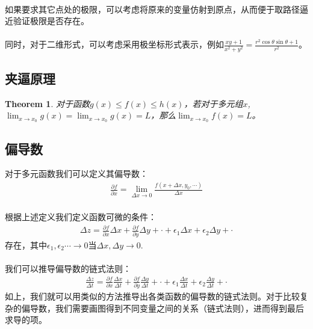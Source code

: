 \documentclass[12pt,a4paper,UTF8]{ctexbook}
\theoremstyle{plain}
\newtheorem{theorem}{\indent Theorem}[section]
\begin{document}
\paragraph{}如果要求其它点处的极限，可以考虑将原来的变量仿射到原点，从而便于取路径逼近验证极限是否存在。
\paragraph{}同时，对于二维形式，可以考虑采用极坐标形式表示，例如$\frac{xy+1}{x^2+y^2}=\frac{r^2\cos \theta \sin \theta +1}{r^2}$。
\subsection{夹逼原理}
\begin{theorem}
对于函数$g(x)\leq f(x)\leq h(x)$，若对于多元组$x$,$\lim_{x\to x_0} g(x)=\lim_{x\to x_0} g(x)=L$，那么$\lim_{x\to x_0} f(x)=L$。
\end{theorem}
\subsection{偏导数}
对于多元函数我们可以定义其偏导数：
\begin{align*}
    \frac{\partial f}{\partial x}=\lim_{\Delta x\to 0}\frac{f(x+\Delta x,y_0,\cdots)}{\Delta x}
\end{align*}
\paragraph{}根据上述定义我们定义函数可微的条件：
\begin{align*}
    \Delta z=\frac{\partial f}{\partial x}\Delta x+\frac{\partial f}{\partial y}\Delta y+\cdot+\epsilon_1 \Delta x+\epsilon_2 \Delta y+\cdot
\end{align*}
存在，其中$\epsilon_1,\epsilon_2\cdots \to 0$当$\Delta x,\Delta y\to 0$.
\paragraph{}我们可以推导偏导数的链式法则：
\begin{align*}
\frac{\Delta z}{\Delta t}=\frac{\partial f}{\partial x}\frac{\Delta x}{\Delta t}+\frac{\partial f}{\partial y}\frac{\Delta y}{\Delta t}+\cdot+\epsilon_1 \frac{\Delta x}{\Delta t}+
\epsilon_2 \frac{\Delta y}{\Delta t}+\cdot
\end{align*}
如上，我们就可以用类似的方法推导出各类函数的偏导数的链式法则。对于比较复杂的偏导数，我们需要画图得到不同变量之间的关系（链式法则），进而得到最后求导的项。
\end{document}
